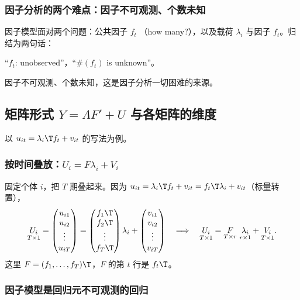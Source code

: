 \subsubsection{因子分析的两个难点：因子不可观测、个数未知}

因子模型面对两个问题：公共因子 $f_t$ （how many?），以及载荷 $\lambda_i$ 与因子 $f_t$。归结为两句话：
\begin{center}
“$f_t$: unobserved”，\qquad “$\#(f_t)$ is unknown”。
\end{center}
因子不可观测、个数未知，这是因子分析一切困难的来源。

\subsection{矩阵形式 \texorpdfstring{$Y=\Lambda F'+U$}{Y = Lambda F' + U} 与各矩阵的维度}

以 $u_{it}=\lambda_i\T f_t+v_{it}$ 的写法为例。

\subsubsection{按时间叠放：\texorpdfstring{$U_i=F\lambda_i+V_i$}{U\_i = F lambda\_i + V\_i}}

固定个体 $i$，把 $T$ 期叠起来。因为 $u_{it}=\lambda_i\T f_t+v_{it}=f_t\T\lambda_i+v_{it}$（标量转置），
\[
\underset{T\times1}{U_i}=\begin{pmatrix}u_{i1}\\u_{i2}\\ \vdots\\u_{iT}\end{pmatrix}
=\begin{pmatrix}f_1\T\\f_2\T\\ \vdots\\f_T\T\end{pmatrix}\lambda_i+\begin{pmatrix}v_{i1}\\v_{i2}\\ \vdots\\v_{iT}\end{pmatrix}
\quad\Longrightarrow\quad
\underset{T\times1}{U_i}=\underset{T\times r}{F}\ \underset{r\times1}{\lambda_i}+\underset{T\times1}{V_i}.
\]
这里 $F=(f_1,\dots,f_T)\T$，$F$ 的第 $t$ 行是 $f_t\T$。

\subsubsection{因子模型是回归元不可观测的回归}

